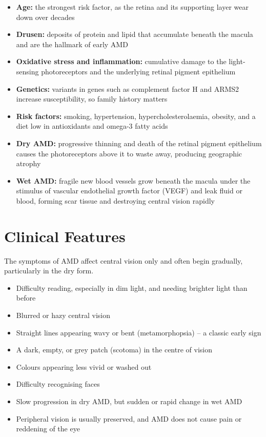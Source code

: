 \begin{itemize}
    \item \textbf{Age:} the strongest risk factor, as the retina and its supporting layer wear down over decades
    \item \textbf{Drusen:} deposits of protein and lipid that accumulate beneath the macula and are the hallmark of early AMD
    \item \textbf{Oxidative stress and inflammation:} cumulative damage to the light-sensing photoreceptors and the underlying retinal pigment epithelium
    \item \textbf{Genetics:} variants in genes such as complement factor H and ARMS2 increase susceptibility, so family history matters
    \item \textbf{Risk factors:} smoking, hypertension, hypercholesterolaemia, obesity, and a diet low in antioxidants and omega-3 fatty acids
    \item \textbf{Dry AMD:} progressive thinning and death of the retinal pigment epithelium causes the photoreceptors above it to waste away, producing geographic atrophy
    \item \textbf{Wet AMD:} fragile new blood vessels grow beneath the macula under the stimulus of vascular endothelial growth factor (VEGF) and leak fluid or blood, forming scar tissue and destroying central vision rapidly
\end{itemize}

\section*{Clinical Features}
The symptoms of AMD affect central vision only and often begin gradually, particularly in the dry form.

\begin{itemize}
    \item Difficulty reading, especially in dim light, and needing brighter light than before
    \item Blurred or hazy central vision
    \item Straight lines appearing wavy or bent (metamorphopsia) -- a classic early sign
    \item A dark, empty, or grey patch (scotoma) in the centre of vision
    \item Colours appearing less vivid or washed out
    \item Difficulty recognising faces
    \item Slow progression in dry AMD, but sudden or rapid change in wet AMD
    \item Peripheral vision is usually preserved, and AMD does not cause pain or reddening of the eye
\end{itemize}

